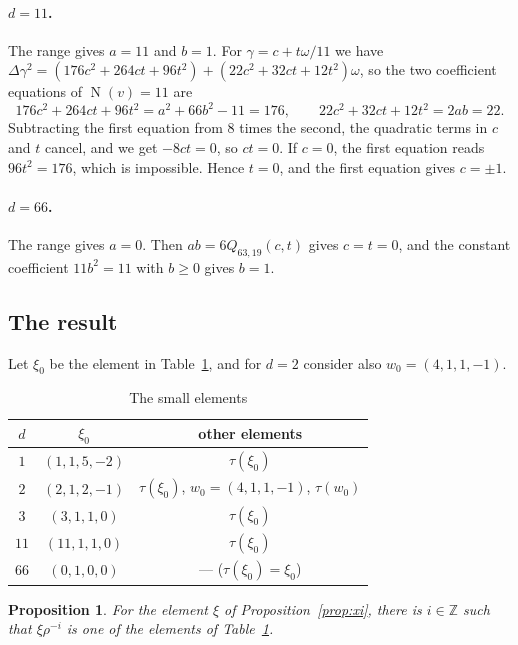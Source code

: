 \documentclass[a4paper,11pt]{article}
\theoremstyle{plain}
\newtheorem{proposition}[theorem]{Proposition}
\theoremstyle{definition}
\theoremstyle{remark}
\numberwithin{equation}{section}
\numberwithin{table}{section}
\newcommand{\Z}{\mathbb{Z}}
\newcommand{\Nm}{\operatorname{N}}
\begin{document}
\paragraph{$d=11$.}
The range gives $a=11$ and $b=1$. For $\gamma=c+t\omega/11$ we have $\Delta\gamma^2=(176c^2+264ct+96t^2)+(22c^2+32ct+12t^2)\omega$, so the two coefficient equations of $\Nm(v)=11$ are
\[
176c^2+264ct+96t^2=a^2+66b^2-11=176,\qquad22c^2+32ct+12t^2=2ab=22.
\]
Subtracting the first equation from $8$ times the second, the quadratic terms in $c$ and $t$ cancel, and we get $-8ct=0$, so $ct=0$.
If $c=0$, the first equation reads $96t^2=176$, which is impossible. Hence $t=0$, and the first equation gives $c=\pm1$.

\paragraph{$d=66$.}
The range gives $a=0$. Then $ab=6Q_{63,19}(c,t)$ gives $c=t=0$, and the constant coefficient $11b^2=11$ with $b\ge0$ gives $b=1$.

\subsection{The result}

Let $\xi_0$ be the element in Table~\ref{tab:reps}, and for $d=2$ consider also $w_0=(4,1,1,-1)$.

\begin{table}[htbp]
\centering
\caption{The small elements}\label{tab:reps}
\begin{tabular}{ccc}
\toprule
$d$ & $\xi_0$ & other elements\\
\midrule
$1$ & $(1,1,5,-2)$ & $\tau(\xi_0)$\\
$2$ & $(2,1,2,-1)$ & $\tau(\xi_0)$, $w_0=(4,1,1,-1)$, $\tau(w_0)$\\
$3$ & $(3,1,1,0)$ & $\tau(\xi_0)$\\
$11$ & $(11,1,1,0)$ & $\tau(\xi_0)$\\
$66$ & $(0,1,0,0)$ & --- ($\tau(\xi_0)=\xi_0$)\\
\bottomrule
\end{tabular}
\end{table}

\begin{proposition}\label{prop:small}
For the element $\xi$ of Proposition~\ref{prop:xi}, there is $i\in\Z$ such that $\xi\rho^{-i}$ is one of the elements of Table~\ref{tab:reps}.
\end{proposition}
\end{document}
